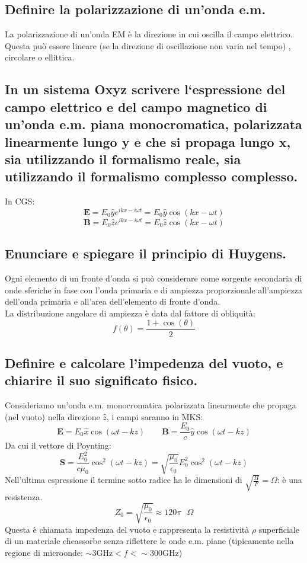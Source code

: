 \subsection[$\ $ Polarizzazione di un'onda]{Definire la polarizzazione di un’onda e.m.}
La polarizzazione di un'onda EM è la direzione in cui oscilla il campo elettrico. Questa può essere lineare (se la direzione di oscillazione non varia nel tempo) , circolare o ellittica.
\subsection[$\ $ Campo elettromagnetico in un sistema di cordinate con il formalismo reale e complesso]{In un sistema Oxyz scrivere l‘espressione del campo elettrico e del campo magnetico di un’onda e.m. piana monocromatica, polarizzata linearmente lungo y e che si propaga lungo x, sia utilizzando il formalismo reale, sia utilizzando il formalismo complesso complesso.}
In CGS:
\[
	\boldsymbol{E} = E_{0} \hat{y} e^{ikx - i\omega t} = E_{0} \hat{y} \cos\left( kx - \omega t \right)   
\] 
\[
	\boldsymbol{B} = E_{0} \hat{z} e^{ikx - i\omega t} = E_{0} \hat{z} \cos\left( kx - \omega t \right)  
\] 
\subsection[$\ $ Principio di Huygens]{Enunciare e spiegare il principio di Huygens.}
Ogni elemento di un fronte d'onda si può considerare come sorgente secondaria di onde sferiche in fase con l'onda primaria e di ampiezza proporzionale all'ampiezza dell'onda primaria e all'area dell'elemento di fronte d'onda. \\
La distribuzione angolare di ampiezza è data dal fattore di obliquità:
\[
	f\left( \theta \right) = \frac{1 + \cos\left( \theta \right) }{2} 
\] 
\subsection[$\ $ Impedenza del vuoto]{Definire e calcolare l'impedenza del vuoto, e chiarire il suo significato fisico. }
Consideriamo un'onda e.m. monocromatica polarizzata linearmente che propaga (nel vuoto) nella direzione $\hat{z}$, i campi saranno in MKS:
\[
	\boldsymbol{E} = E_{0} \hat{x} \cos\left( \omega t - kz \right) \quad \quad
	\boldsymbol{B} = \frac{E_{0}}{c} \hat{y} \cos\left( \omega t - kz \right) 
\] 
Da cui il vettore di Poynting:
\[
	\boldsymbol{S} = \frac{E_{0}^2}{c \mu_{0}}\cos^2\left( \omega t - kz \right) = \sqrt{\frac{\mu_0}{\epsilon_0}}E_0^2 \cos^2\left( \omega t - kz \right)   
\] 
Nell'ultima espressione il termine sotto radice ha le dimensioni di $\sqrt{\frac{H}{F}} = \Omega$: è una resistenza.  
\[
	Z_{0} = \sqrt{\frac{\mu_{0}}{\epsilon_0}} \approx 120 \pi \text{ }\Omega
\]
Questa è chiamata impedenza del vuoto e rappresenta la resistività $\rho$ superficiale di un materiale cheassorbe senza riflettere le onde e.m. piane (tipicamente nella regione di microonde: $\sim 3 \text{GHz} < f < \sim 300 \text{GHz}$) 

